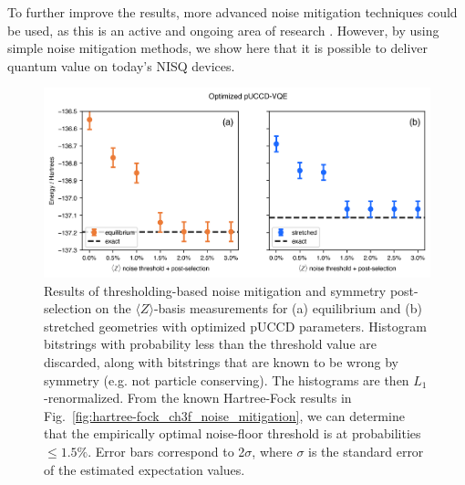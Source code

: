 \documentclass[journal,onecolumn]{IEEEtran}
\begin{document}
To further improve the results, more advanced noise mitigation techniques could be used, as this is an active and ongoing area of research \cite{Bonet-Monroig2018-xa,Montanaro2021-yv,Bennewitz2022-fo,Quek2022-ly,Kandala2019-rz,OBrien2022-aa,Weber2021-eg}. 
However, by using simple noise mitigation methods, we show here that it is possible to deliver quantum value on today's NISQ devices.

\begin{figure}[!htb]
\centering
\includegraphics[width=\textwidth]{puccd_ch3f_noise_mitigation.png}
\caption{Results of thresholding-based noise mitigation and symmetry post-selection on the $\langle Z \rangle$-basis measurements for (a) equilibrium and (b) stretched  geometries with optimized pUCCD parameters. Histogram bitstrings with probability less than the threshold value are discarded, along with bitstrings that are known to be wrong by symmetry (e.g. not particle conserving). The histograms are then $L_1$-renormalized. From the known Hartree-Fock results in Fig.~\ref{fig:hartree-fock_ch3f_noise_mitigation}, we can determine that the empirically optimal noise-floor threshold is at probabilities $\leq 1.5\%$. Error bars correspond to 2$\sigma$, where $\sigma$ is the standard error of the estimated expectation values. }
\label{fig:puccd_ch3f_noise_mitigation}
\end{figure}
\end{document}
